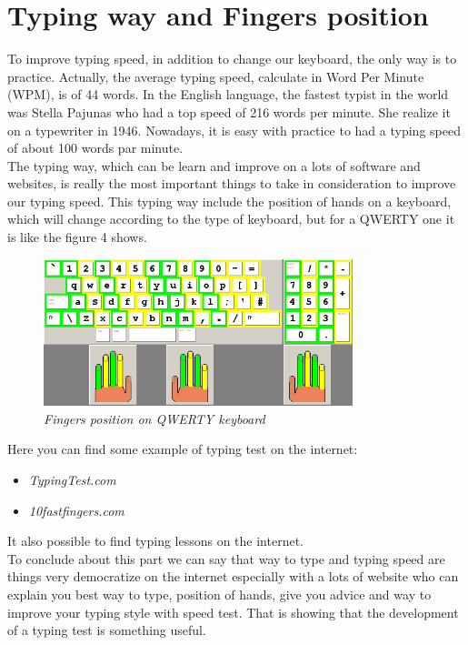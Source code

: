 \section{Typing way and Fingers position}
To improve typing speed, in addition to change our keyboard, the only way is to practice. Actually, the average typing speed, calculate in Word Per Minute (WPM), is of 44 words.\cite{ref7} In the English language, the fastest typist in the world was Stella Pajunas who had a top speed of 216 words per minute. She realize it on a typewriter in 1946. Nowadays, it is easy with practice to had a typing speed of about 100 words par minute.\\ 
The typing way, which can be learn and improve on a lots of software and websites, is really the most important things to take in consideration to improve our typing speed. This typing way include the position of hands on a keyboard, which will change according to the type of keyboard, but for a QWERTY one it is like the figure 4 shows.
\begin{figure}[H]
\begin{center}
\includegraphics[width=9cm]{images/FingerHandPosUSA.png} 
\end{center}
\caption{\it Fingers position on QWERTY keyboard}
\label{Poulpy est multicolore}
\end{figure}
Here you can find some example of typing test on the internet:
\begin{itemize}
\item\it TypingTest.com\cite{ref8}
\item\it 10fastfingers.com\cite{ref9}
\end{itemize}
It also possible to find typing lessons on the internet.\\
To conclude about this part we can say that way to type and typing speed are things very democratize on the internet especially with a lots of website who can explain you best way to type, position of hands, give you advice and way to improve your typing style with speed test. That is showing that the development of a typing test is something useful.
